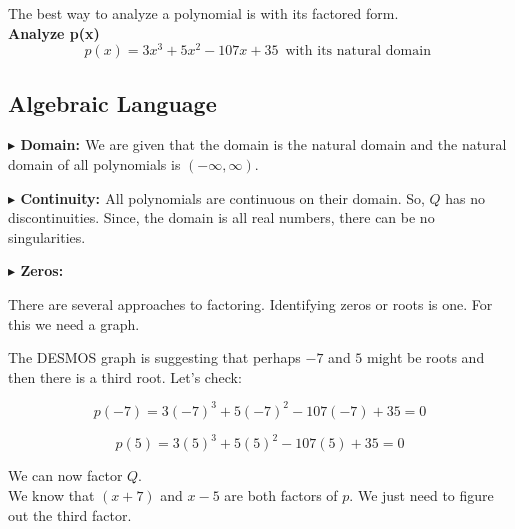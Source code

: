 \documentclass{ximera}
\author{Lee Wayand}
\begin{document}
\begin{exercise}



The best way to analyze a polynomial is with its factored form. \\


\textbf{Analyze p(x)} \\

\[
p(x) = 3 x^3 + 5 x^2 - 107 x + 35 \, \text { with its natural domain } 
\]






\subsection*{Algebraic Language}



\textbf{\textcolor{blue!55!black}{$\blacktriangleright$ Domain: }} We are given that the domain is the natural domain and the natural domain of all polynomials is $(-\infty, \infty)$.


\textbf{\textcolor{blue!55!black}{$\blacktriangleright$ Continuity: }}  All polynomials are continuous on their domain.  So, $Q$ has no discontinuities.  Since, the domain is all real numbers, there can be no singularities.



\textbf{\textcolor{blue!55!black}{$\blacktriangleright$ Zeros: }}  


There are several approaches to factoring.  Identifying zeros or roots is one.  For this we need a graph.




\begin{center}
\end{center}



The DESMOS graph is suggesting that perhaps $-7$ and $5$ might be roots and then there is a third root.  Let's check:



\[
p(-7) = 3 (-7)^3 + 5 (-7)^2 - 107 (-7) + 35 = 0
\]



\[
p(5) = 3 (5)^3 + 5 (5)^2 - 107 (5) + 35 = 0
\]



We can now factor $Q$. \\


We know that $(x+7)$ and $x-5$ are both factors of $p$. We just need to figure out the third factor.





\end{exercise}
\end{document}
